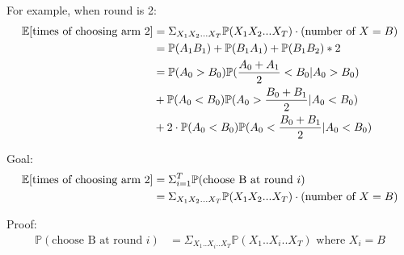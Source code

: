 \documentclass[fleqn]{article}
\def\PP{{\mathbb P}}\def\QQ{{\mathbb Q}}\def\RR{{\mathbb R}}
\begin{document}
For example, when round is 2:
\begin{align*}
    \EE[\text{times of choosing arm 2}]&=\Sigma_{X_1X_2...X_T}{\PP(X_1X_2...X_T)\cdot(\text{number of }X=B)}\\
    &= \PP(A_1B_1) + \PP(B_1A_1) + \PP(B_1B_2)*2\\
    &= \PP(A_0>B_0)\PP(\frac{A_0+A_1}{2}<B_0|A_0>B_0)\\
    &+\PP(A_0<B_0)\PP(A_0>\frac{B_0+B_1}{2}|A_0<B_0)\\
    &+2\cdot\PP(A_0<B_0)\PP(A_0<\frac{B_0+B_1}{2}|A_0<B_0)
\end{align*}

Goal: 
\begin{align*}
\EE[\text{times of choosing arm 2}]&=\Sigma_{i=1}^T{\PP(\text{choose B at round }i)}\\
&=\Sigma_{X_1X_2...X_T}{\PP(X_1X_2...X_T)\cdot(\text{number of }X=B)}
\end{align*}

Proof:
\begin{align*}
\PP(\text{choose B at round }i)&=\Sigma_{X_1..X_i..X_T}{\PP(X_1..X_i..X_T)} \text{ where } X_i=B
\end{align*}
\end{document}
